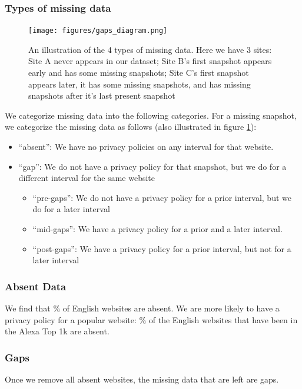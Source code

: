 \subsubsection{Types of missing data}


\begin{figure}[t]
\centering
\texttt{[image: figures/gaps\_diagram.png]}
\caption{An illustration of the 4 types of missing data. Here we have 3 sites: Site A never appears in our dataset; Site B's first snapshot appears early and has some missing snapshots; Site C's first snapshot appears later, it has some missing snapshots, and has missing snapshots after it's last present snapshot}
\label{fig:missing_types}
\end{figure}

We categorize missing data into the following categories. For a missing snapshot, we categorize the missing data as follows (also illustrated in figure \ref{fig:missing_types}):
\begin{itemize}
    \item ``absent'': We have no privacy policies on any interval for that website.
    \item ``gap'': We do not have a privacy policy for that snapshot, but we do for a different interval for the same website
    \begin{itemize}
        \item ``pre-gaps'': We do not have a privacy policy for a prior interval, but we do for a later interval
        \item ``mid-gaps'': We have a privacy policy for a prior and a later interval.
        \item ``post-gaps'': We have a privacy policy for a prior interval, but not for a later interval
    \end{itemize}
\end{itemize}

\subsubsection{Absent Data}
We find that \absentEngPerc\% of English websites are absent. We are more likely to have a privacy policy for a popular website: \absentEngOneKPerc\% of the English websites that have been in the Alexa Top 1k are absent.

\subsubsection{Gaps}
Once we remove all absent websites, the missing data that are left are gaps.

